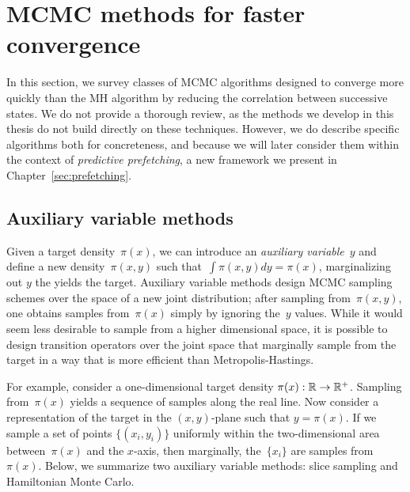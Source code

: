 \documentclass[angelino.tex]{subfiles}
\begin{document}



\section{MCMC methods for faster convergence}

In this section, we survey classes of MCMC algorithms designed to
converge more quickly than the MH algorithm by reducing the 
correlation between successive states.
We do not provide a thorough review, as the methods we develop in this
thesis do not build directly on these techniques.
However, we do describe specific algorithms both for concreteness, and because
we will later consider them within the context of \emph{predictive prefetching},
a new framework we present in Chapter~\ref{sec:prefetching}.


\subsection{Auxiliary variable methods}

Given a target density~$\pi(x)$, we can introduce an
\emph{auxiliary variable}~$y$ and define a new density~$\pi(x, y)$
such that~$\int \pi(x, y) dy = \pi(x)$,
\ie marginalizing out $y$ the yields the target.
Auxiliary variable methods design MCMC sampling schemes over the space of a new
joint distribution; after sampling from~$\pi(x, y)$, one obtains samples 
from~$\pi(x)$ simply by ignoring the~$y$ values.
While it would seem less desirable to sample from a higher dimensional space,
it is possible to design transition operators over the joint space that
marginally sample from the target in a way that is more efficient than
Metropolis-Hastings.

For example, consider a one-dimensional target density
$\pi(x): \mathbb{R} \rightarrow \mathbb{R}^+$.
Sampling from~$\pi(x)$ yields a sequence of samples along the real line.
Now consider a representation of the target in the $(x, y)$-plane
such that $y = \pi(x)$.
If we sample a set of points $\{(x_i, y_i)\}$ uniformly within the 
two-dimensional area between~$\pi(x)$ and the $x$-axis, then marginally,
the~$\{x_i\}$ are samples from~$\pi(x)$.
Below, we summarize two auxiliary variable methods:
slice sampling and Hamiltonian Monte Carlo.
\end{document}
